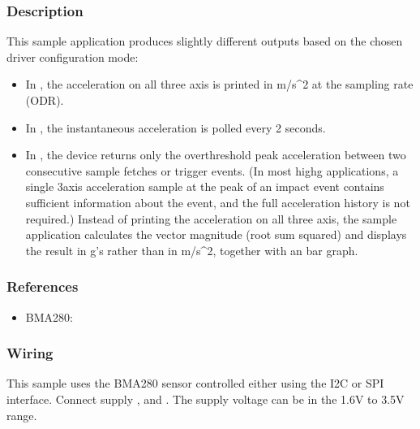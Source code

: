 \documentclass[letterpaper,10pt,english]{sphinxmanual}
\begin{document}
\subsubsection{Description}
\label{\detokenize{samples/sensor/bma280/README:description}}
This sample application produces slightly different outputs based on the chosen
driver configuration mode:
\begin{itemize}
\item {} 
In ,
the acceleration on all three axis is printed in m/s\textasciicircum{}2 at the sampling rate (ODR).

\item {} 
In , the instantaneous acceleration is polled every 2 seconds.

\item {} 
In , the device returns only the over\sphinxhyphen{}threshold
peak acceleration between two consecutive sample fetches or trigger events.
(In most high\sphinxhyphen{}g applications, a single 3\sphinxhyphen{}axis acceleration sample at the peak
of an impact event contains sufficient information about the event, and the
full acceleration history is not required.) Instead of printing the acceleration
on all three axis, the sample application calculates the vector magnitude
(root sum squared) and displays the result in g’s rather than in m/s\textasciicircum{}2,
together with an bar graph.

\end{itemize}


\subsubsection{References}
\label{\detokenize{samples/sensor/bma280/README:references}}\begin{itemize}
\item {} 
BMA280: 

\end{itemize}


\subsubsection{Wiring}
\label{\detokenize{samples/sensor/bma280/README:wiring}}
This sample uses the BMA280 sensor controlled either using the I2C or SPI interface.
Connect supply ,  and . The supply voltage can be in
the 1.6V to 3.5V range.
\end{document}
